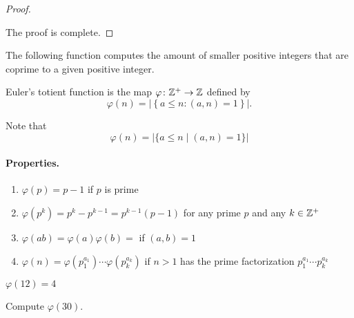 \documentclass[11pt,a4paper]{article}
\begin{document}
\begin{proof}
\begin{enumerate}[left=2cm]


\end{enumerate}
The proof is complete.
\end{proof}

The following function  computes the amount of smaller positive integers that are coprime to a given positive integer.
\begin{defi}%
    Euler's totient function is the map  \(\varphi \colon \mathbb{Z}^+\to \mathbb{Z}\) defined by 
    \[\varphi(n) = |\left\{ a\leq n : (a,n) = 1 \right\}|.\]
\end{defi}

Note that \[\varphi(n)=\big|\{a \leq n \mid(a, n)=1\}\big|\]



\paragraph{Properties.} 

\begin{enumerate}[label=(\roman*)]
    \item \(\varphi(p) = p-1\) if \(p\) is prime 
    \item \(\varphi(p^k) = p^k - p^{k-1} = p^{k-1}(p-1)\) for any prime \(p\) and any \(k\in \mathbb{Z}^+\)
    \item \(\varphi(ab) = \varphi(a)\varphi(b) = \) if \((a,b) = 1\)
    \item \(\varphi(n) = \varphi(p_1^{a_1})\cdots\varphi(p_k^{a_k})\) if \(n > 1\) has the prime factorization \(p_1^{a_1}\cdots p_k^{a_k}\)
\end{enumerate}


\begin{exa}
    \(\varphi(12) = 4\)
\end{exa}

\begin{eje}
    Compute \(\varphi(30)\).
\end{eje}
\end{document}
